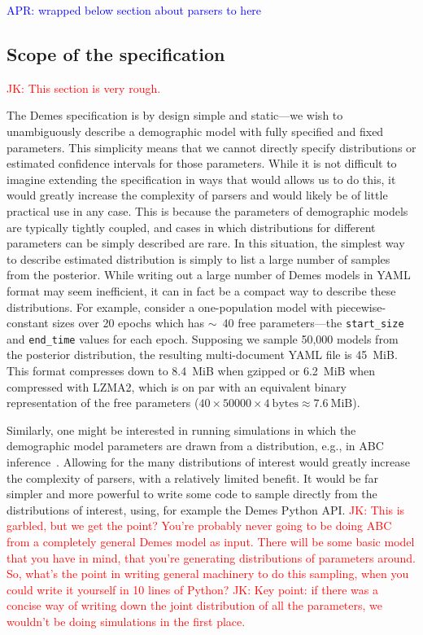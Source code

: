 \documentclass[11pt]{article}
\newcommand{\aprcomment}[1]{{\textcolor{blue}{APR: #1}}}
\newcommand{\jkcomment}[1]{{\textcolor{red}{JK: #1}}}
\begin{document}
\aprcomment{wrapped below section about parsers to here}

\subsection*{Scope of the specification}
\jkcomment{This section is very rough.}


The Demes specification is by design simple and static---we wish to
unambiguously describe a demographic model with fully specified
and fixed parameters. This simplicity means that we cannot directly
specify distributions or estimated confidence intervals
for those parameters. While it is not difficult to imagine extending
the specification in ways that would allows us to do this, it would
greatly increase the complexity of parsers and would likely be of
little practical use in any case. This is because the parameters of
demographic models are typically tightly coupled, and cases in which
distributions for different parameters can be simply described are rare.
In this situation, the simplest way to describe estimated
distribution is simply to list a large number of samples from
the posterior. While writing out a large number of Demes models in
YAML format may seem inefficient, it can in fact be a compact
way to describe these distributions.
For example, consider a one-population model with piecewise-constant sizes over
20 epochs which has $\sim$~40 free parameters---the \texttt{start\_size} and
\texttt{end\_time} values for each epoch. Supposing we sample 50,000 models
from the posterior distribution, the resulting multi-document YAML file is
45~MiB.
This format compresses down to 8.4~MiB when gzipped or 6.2~MiB
when compressed with LZMA2, which is on par with an equivalent binary
representation of the free parameters
($40\times50000\times4~\text{bytes} \approx 7.6~\text{MiB}$).

Similarly, one might be interested in running simulations in which
the demographic model parameters are drawn from a distribution, e.g.,
in ABC inference~\citep{beaumont2002approximate}. Allowing for
the many distributions of interest would greatly increase the complexity of
parsers, with a relatively limited benefit. It would be far simpler
and more powerful to write some code to sample directly from the
distributions of interest, using, for example the Demes Python
API.
\jkcomment{This is garbled, but we get the point? You're probably never
going to be doing ABC from a completely general Demes model as input.
There will be some basic model that you have in mind, that you're generating
distributions of parameters around. So, what's the point in writing
general machinery to do this sampling, when you could write it yourself in
10 lines of Python?}
\jkcomment{Key point: if there was a concise way of writing down the joint
distribution of all the parameters, we wouldn't be doing simulations in the
first place.}
\end{document}
